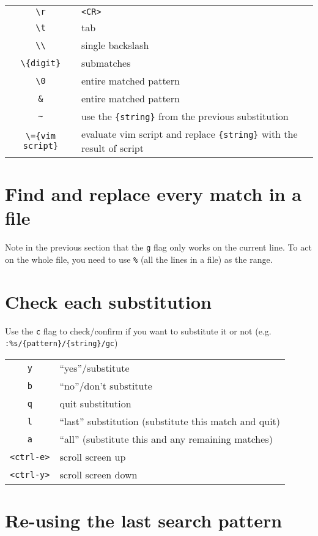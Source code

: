\begin{tabular}{c|l}
\verb|\r|             & \verb|<CR>| \\
\verb|\t|             &  tab\\
\verb|\\|             & single backslash \\
\verb|\{digit}|       & submatches \\
\verb|\0|             & entire matched pattern\\
\verb|&|  & entire matched pattern\\
\verb|~|              &  use the \verb|{string}| from the previous substitution\\
\verb|\={vim script}| & evaluate vim script and replace \verb|{string}| with the result of script\\
\end{tabular}

\section{Find and replace every match in a file}

Note in the previous section that the \verb|g| flag only works on the current line.
To act on the whole file, you need to use \verb|%| (all the lines in a file) as the range.

\section{Check each substitution}

Use the \verb|c| flag to check/confirm if you want to substitute it or not (e.g. \verb|:%s/{pattern}/{string}/gc|)
\newline

\begin{tabular}{c|l}
\verb|y| & ``yes''/substitute\\
\verb|b| & ``no''/don't substitute\\
\verb|q| & quit substitution\\
\verb|l| & ``last'' substitution (substitute this match and quit)\\
\verb|a| & ``all'' (substitute this and any remaining matches)\\
\verb|<ctrl-e>| & scroll screen up\\
\verb|<ctrl-y>| & scroll screen down\\
\end{tabular}

\section{Re-using the last search pattern}

